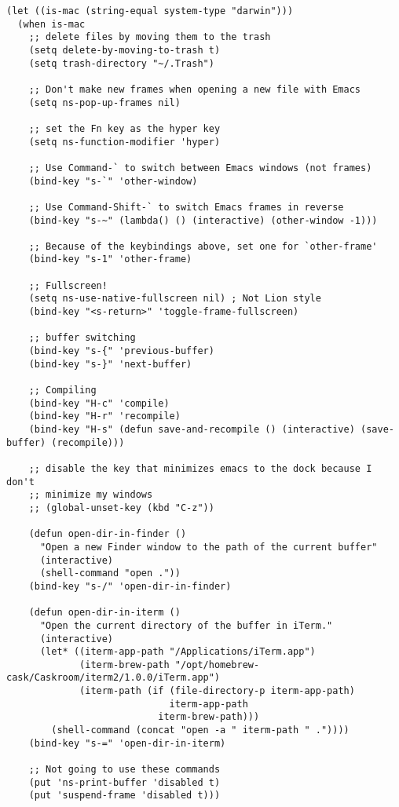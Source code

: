 \documentclass[11pt]{article}
\begin{document}
\begin{verbatim}
(let ((is-mac (string-equal system-type "darwin")))
  (when is-mac
    ;; delete files by moving them to the trash
    (setq delete-by-moving-to-trash t)
    (setq trash-directory "~/.Trash")

    ;; Don't make new frames when opening a new file with Emacs
    (setq ns-pop-up-frames nil)

    ;; set the Fn key as the hyper key
    (setq ns-function-modifier 'hyper)

    ;; Use Command-` to switch between Emacs windows (not frames)
    (bind-key "s-`" 'other-window)

    ;; Use Command-Shift-` to switch Emacs frames in reverse
    (bind-key "s-~" (lambda() () (interactive) (other-window -1)))

    ;; Because of the keybindings above, set one for `other-frame'
    (bind-key "s-1" 'other-frame)

    ;; Fullscreen!
    (setq ns-use-native-fullscreen nil) ; Not Lion style
    (bind-key "<s-return>" 'toggle-frame-fullscreen)

    ;; buffer switching
    (bind-key "s-{" 'previous-buffer)
    (bind-key "s-}" 'next-buffer)

    ;; Compiling
    (bind-key "H-c" 'compile)
    (bind-key "H-r" 'recompile)
    (bind-key "H-s" (defun save-and-recompile () (interactive) (save-buffer) (recompile)))

    ;; disable the key that minimizes emacs to the dock because I don't
    ;; minimize my windows
    ;; (global-unset-key (kbd "C-z"))

    (defun open-dir-in-finder ()
      "Open a new Finder window to the path of the current buffer"
      (interactive)
      (shell-command "open ."))
    (bind-key "s-/" 'open-dir-in-finder)

    (defun open-dir-in-iterm ()
      "Open the current directory of the buffer in iTerm."
      (interactive)
      (let* ((iterm-app-path "/Applications/iTerm.app")
             (iterm-brew-path "/opt/homebrew-cask/Caskroom/iterm2/1.0.0/iTerm.app")
             (iterm-path (if (file-directory-p iterm-app-path)
                             iterm-app-path
                           iterm-brew-path)))
        (shell-command (concat "open -a " iterm-path " ."))))
    (bind-key "s-=" 'open-dir-in-iterm)

    ;; Not going to use these commands
    (put 'ns-print-buffer 'disabled t)
    (put 'suspend-frame 'disabled t)))
\end{verbatim}
\end{document}
